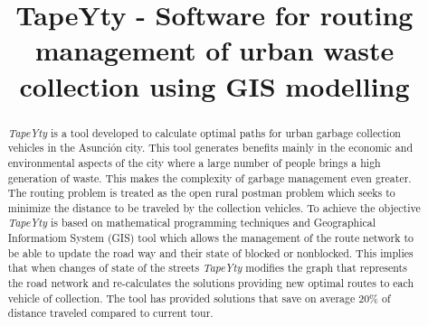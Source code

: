 \documentclass[conference,compsoc]{IEEEtran}
\begin{document}
\begin{otherlanguage}{english}
\title{TapeYty - Software for routing management of urban waste collection using GIS modelling\\
}

\author{
}

\maketitle

\begin{abstract}
\textit{TapeYty} is a tool developed to calculate optimal paths for urban garbage collection vehicles in the Asunción city. This tool generates benefits mainly in the economic and environmental aspects of the city where a large number of people brings a high generation of waste. This makes the complexity of garbage management even greater. The routing problem is treated as the open rural postman problem which seeks to minimize the distance to be traveled by the collection vehicles. To achieve the objective \textit{TapeYty} is based on mathematical programming techniques and Geographical Informatiom System (GIS) tool which allows the management of the route network to be able to update the road way and their state of blocked or nonblocked. This implies that when changes of state of the streets \textit{TapeYty} modifies the graph that represents the road network and re-calculates the solutions providing new optimal routes to each vehicle of collection. The tool has provided solutions that save on average 20\% of distance traveled compared to current tour.
\end{abstract}


\end{otherlanguage}
\end{document}
